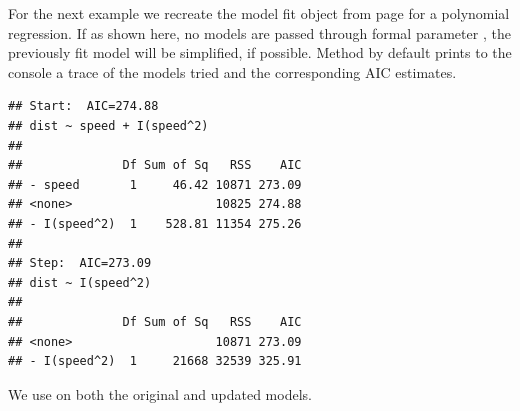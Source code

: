 \documentclass[krantz2]{krantz}\usepackage{knitr}
\begin{document}
For the next example we recreate the model fit object  from page \pageref{chunk:stats:fm3} for a polynomial regression. If as shown here, no models are passed through formal parameter , the previously fit model will be simplified, if possible. Method  by default prints to the console a trace of the models tried and the corresponding AIC estimates.

\begin{knitrout}\footnotesize
{}\color{fgcolor}\begin{kframe}
\begin{alltt}
 \hlkwb{<-}  \hlopt{~}  \hlopt{+} \hlopt{^}\hlstd{),}  
 \hlkwb{<-} 
\end{alltt}
\begin{verbatim}
## Start:  AIC=274.88
## dist ~ speed + I(speed^2)
## 
##              Df Sum of Sq   RSS    AIC
## - speed       1     46.42 10871 273.09
## <none>                    10825 274.88
## - I(speed^2)  1    528.81 11354 275.26
## 
## Step:  AIC=273.09
## dist ~ I(speed^2)
## 
##              Df Sum of Sq   RSS    AIC
## <none>                    10871 273.09
## - I(speed^2)  1     21668 32539 325.91
\end{verbatim}
\end{kframe}
\end{knitrout}

We use  on both the original and updated models.
\end{document}
